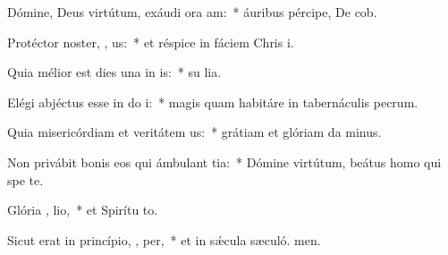 \item Dómine, Deus virtútum, exáudi ora am:~* áuribus pércipe, De cob.
\item Protéctor noster, , us:~* et réspice in fáciem Chris i.
\item Quia mélior est dies una in  is:~* su lia.
\item Elégi abjéctus esse in do  i:~* magis quam habitáre in tabernáculis pecrum.
\item Quia misericórdiam et veritátem  us:~* grátiam et glóriam da minus.
\item Non privábit bonis eos qui ámbulant  tia:~* Dómine virtútum, beátus homo qui spe  te.
\item Glória ,  lio,~* et Spirítu to.
\item Sicut erat in princípio,  ,  per,~* et in sǽcula sæculó. men.
